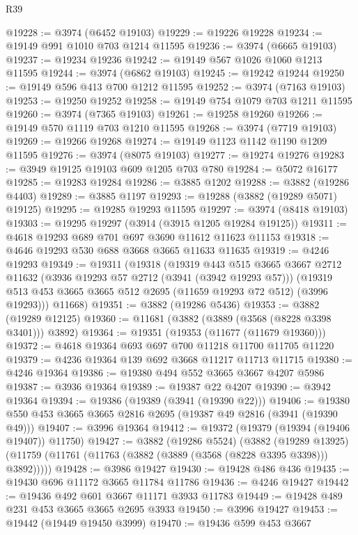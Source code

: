 \begin{lexlean}{R39}
\begin{coremodule}
@19228 := @3974 (@6452 @19103)
@19229 := @19226 @19228
@19234 := @19149 @991 @1010 @703 @1214 @11595
@19236 := @3974 (@6665 @19103)
@19237 := @19234 @19236
@19242 := @19149 @567 @1026 @1060 @1213 @11595
@19244 := @3974 (@6862 @19103)
@19245 := @19242 @19244
@19250 := @19149 @596 @413 @700 @1212 @11595
@19252 := @3974 (@7163 @19103)
@19253 := @19250 @19252
@19258 := @19149 @754 @1079 @703 @1211 @11595
@19260 := @3974 (@7365 @19103)
@19261 := @19258 @19260
@19266 := @19149 @570 @1119 @703 @1210 @11595
@19268 := @3974 (@7719 @19103)
@19269 := @19266 @19268
@19274 := @19149 @1123 @1142 @1190 @1209 @11595
@19276 := @3974 (@8075 @19103)
@19277 := @19274 @19276
@19283 := @3949 @19125 @19103 @609 @1205 @703 @780
@19284 := @5072 @16177
@19285 := @19283 @19284
@19286 := @3885 @1202
@19288 := @3882 (@19286 @4403)
@19289 := @3885 @1197
@19293 := @19288 (@3882 (@19289 @5071) @19125)
@19295 := @19285 @19293 @11595
@19297 := @3974 (@8418 @19103)
@19303 := @19295 @19297 (@3914 (@3915 @1205 @19284 @19125))
@19311 := @4618 @19293 @689 @701 @697 @3690 @11612 @11623 @11153
@19318 := @4646 @19293 @530 @688 @3668 @3665 @11633 @11635
@19319 := @4246 @19293
@19349 := @19311
    (@19318
      (@19319
        @443
        @515
        @3665
        @3667
        @2712
        @11632
        (@3936 @19293 @57 @2712 (@3941 (@3942 @19293 @57)))
        (@19319 @513 @453 @3665 @3665 @512 @2695 (@11659 @19293 @72 @512) (@3996 @19293)))
      @11668)
@19351 := @3882 (@19286 @5436)
@19353 := @3882 (@19289 @12125)
@19360 := @11681 (@3882 (@3889 (@3568 (@8228 @3398 @3401))) @3892)
@19364 := @19351 (@19353 (@11677 (@11679 @19360)))
@19372 := @4618 @19364 @693 @697 @700 @11218 @11700 @11705 @11220
@19379 := @4236 @19364 @139 @692 @3668 @11217 @11713 @11715
@19380 := @4246 @19364
@19386 := @19380 @494 @552 @3665 @3667 @4207 @5986
@19387 := @3936 @19364
@19389 := @19387 @22 @4207
@19390 := @3942 @19364
@19394 := @19386 (@19389 (@3941 (@19390 @22)))
@19406 := @19380 @550 @453 @3665 @3665 @2816 @2695 (@19387 @49 @2816 (@3941 (@19390 @49)))
@19407 := @3996 @19364
@19412 := @19372 (@19379 (@19394 (@19406 @19407)) @11750)
@19427 := @3882
    (@19286 @5524)
    (@3882
      (@19289 @13925)
      (@11759 (@11761 (@11763 (@3882 (@3889 (@3568 (@8228 @3395 @3398))) @3892)))))
@19428 := @3986 @19427
@19430 := @19428 @486 @436
@19435 := @19430 @696 @11172 @3665 @11784 @11786
@19436 := @4246 @19427
@19442 := @19436 @492 @601 @3667 @11171 @3933 @11783
@19449 := @19428 @489 @231 @453 @3665 @3665 @2695 @3933
@19450 := @3996 @19427
@19453 := @19442 (@19449 @19450 @3999)
@19470 := @19436
    @599
    @453
    @3667

\end{coremodule}
\end{lexlean}
